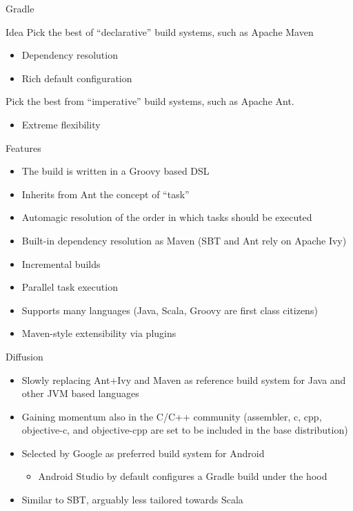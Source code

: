 \documentclass[presentation]{beamer}
\begin{document}
\begin{frame}{Gradle}
	\begin{block}{Idea}
		Pick the best of ``declarative'' build systems, such as Apache Maven
		\begin{itemize}
			\item Dependency resolution
			\item Rich default configuration
		\end{itemize}
		Pick the best from ``imperative'' build systems, such as Apache Ant.
		\begin{itemize}
			\item Extreme flexibility
		\end{itemize}
	\end{block}
	\begin{block}{Features}
		\begin{itemize}
			\item The build is written in a Groovy based DSL
			\item Inherits from Ant the concept of ``task''
			\item Automagic resolution of the order in which tasks should be executed
			\item Built-in dependency resolution as Maven (SBT and Ant rely on Apache Ivy)
			\item Incremental builds
			\item Parallel task execution
			\item Supports many languages (Java, Scala, Groovy are first class citizens)
			\item Maven-style extensibility via plugins
		\end{itemize}
	\end{block}
	\begin{block}{Diffusion}
		\begin{itemize}
			\item Slowly replacing Ant+Ivy and Maven as reference build system for Java and other JVM based languages
			\item Gaining momentum also in the C/C++ community (assembler, c, cpp, objective-c, and objective-cpp are set to be included in the base distribution)
			\item Selected by Google as preferred build system for Android
			\begin{itemize}
				\item Android Studio by default configures a Gradle build under the hood
			\end{itemize}
			\item Similar to SBT, arguably less tailored towards Scala

\end{itemize}
\end{block}
\end{frame}
\end{document}
